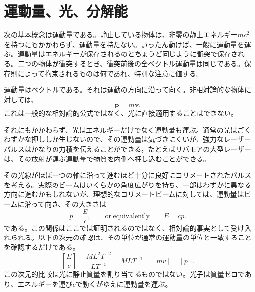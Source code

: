 \begin{classroomqa}
\end{classroomqa}

\begin{classroomqa}
\end{classroomqa}

\section{運動量、光、分解能}

次の基本概念は運動量である。静止している物体は、非零の静止エネルギー\(mc^2\)を持つにもかかわらず、運動量を持たない。いったん動けば、一般に運動量を運ぶ。運動量はエネルギーが保存されるのとちょうど同じように衝突で保存される。二つの物体が衝突するとき、衝突前後の全ベクトル運動量は同じである。保存則によって拘束されるものは何であれ、特別な注意に値する。

運動量はベクトルである。それは運動の方向に沿って向く。非相対論的な物体に対しては、
\begin{equation}
\mathbf p=m\mathbf v.
\end{equation}
これは一般的な相対論的公式ではなく、光に直接適用することはできない。

それにもかかわらず、光はエネルギーだけでなく運動量も運ぶ。通常の光はごくわずかな押ししか生じないので、その運動量は気づきにくいが、強力なレーザーパルスはかなりの力積を伝えることができる。たとえばリバモアの大型レーザーは、その放射が運ぶ運動量で物質を内側へ押し込むことができる。

その光線がほぼ一つの軸に沿って進むほど十分に良好にコリメートされたパルスを考える。実際のビームはいくらかの角度広がりを持ち、一部はわずかに異なる方向に進むかもしれないが、理想的なコリメートビームに対しては、運動量はビームに沿って向き、その大きさは
\begin{equation}
p=\frac{E}{c},
\qquad\text{or equivalently}\qquad
E=cp.
\end{equation}
である。この関係はここでは証明されるのではなく、相対論的事実として受け入れられる。以下の次元の確認は、その単位が通常の運動量の単位と一致することを確認するだけである。
\begin{equation}
\left[\frac{E}{c}\right]
=
\frac{M L^2 T^{-2}}{L T^{-1}}
=
M L T^{-1}
=
[m v]
=
[p].
\end{equation}
この次元的比較は光に静止質量を割り当てるものではない。光子は質量ゼロであり、エネルギーを運び\(c\)で動くがゆえに運動量を運ぶ。

